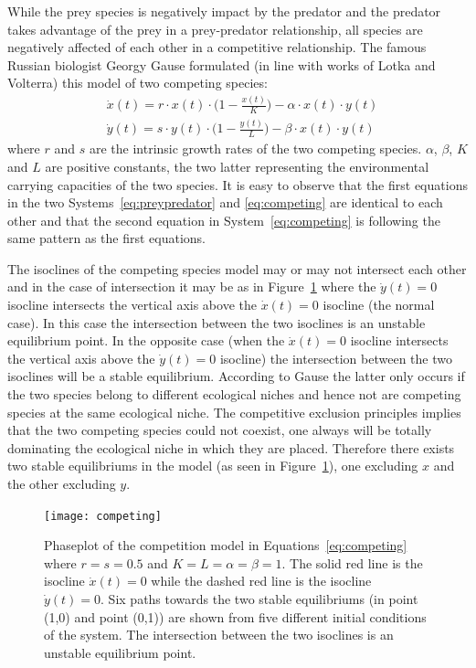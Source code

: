 \documentclass[11pt,fleqn]{book} %
\begin{document}
While the prey species is negatively impact by the predator and the predator takes advantage of the prey in a prey-predator relationship, all species are negatively affected of each other in a competitive relationship. The famous Russian biologist Georgy Gause formulated (in line with works of Lotka and Volterra) this model of two competing species\cite{Gause1935}:
\begin{equation}
\label{eq:competing}
\begin{aligned} & \dot{x}(t) = r \cdot x(t) \cdot \bigg(1 - \frac{x(t)}{K}\bigg) - \alpha \cdot x(t) \cdot y(t) \\
& \dot{y}(t) = s \cdot y(t) \cdot \bigg(1 - \frac{y(t)}{L}\bigg) - \beta \cdot x(t) \cdot y(t)
\end{aligned}
\end{equation}
where $r$ and $s$ are the intrinsic growth rates of the two competing species. $\alpha$, $\beta$, $K$ and $L$ are positive constants, the two latter representing the environmental carrying capacities of the two species. It is easy to observe that the first equations in the two Systems~\ref{eq:preypredator} and \ref{eq:competing} are identical to each other and that the second equation in System~\ref{eq:competing} is following the same pattern as the first equations.

The isoclines of the competing species model may or may not intersect each other and in the case of intersection it may be as in Figure~\ref{fig:competing} where the $\dot{y}(t)=0$ isocline intersects the vertical axis above the $\dot{x}(t)=0$ isocline (the normal case). In this case the intersection between the two isoclines is an unstable equilibrium point. In the opposite case (when the $\dot{x}(t)=0$ isocline intersects the vertical axis above the $\dot{y}(t)=0$ isocline) the intersection between the two isoclines will be a stable equilibrium. According to Gause the latter only occurs if the two species belong to different ecological niches\cite{Gause1935} and hence not are competing species at the same ecological niche. The competitive exclusion principles implies that the two competing species could not coexist, one always will be totally dominating the ecological niche in which they are placed. Therefore there exists two stable equilibriums in the model (as seen in Figure~\ref{fig:competing}), one excluding $x$ and the other excluding $y$.

\begin{figure}[ht]
\centering
\texttt{[image: competing]}
\caption{Phaseplot of the competition model in Equations~\ref{eq:competing} where $r = s = 0.5$ and $K = L = \alpha = \beta = 1$. The solid red line is the isocline $ \dot{x}(t) = 0$ while the dashed red line is the isocline $ \dot{y}(t) = 0$. Six paths towards the two stable equilibriums (in point (1,0) and point (0,1)) are shown from five different initial conditions of the system. The intersection between the two isoclines is an unstable equilibrium point.}
\label{fig:competing}
\end{figure}
\end{document}

